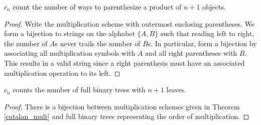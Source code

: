\documentclass[a4paper]{article}
\begin{document}
\begin{theorem}\label{catalan_mult}
$c_n$ count the number of ways to parenthesize a product of $n+1$ objects.

\begin{hl}
\begin{proof}
Write the multiplication scheme with outermost enclosing parentheses. We form a bijection to strings on the alphabet $\{A,B\}$ such that reading left to right, the number of $A$s never trails the number of $B$s. In particular, form a bijection by associating all multiplication symbols with $A$ and all right parentheses with $B$. This results in a valid string since a right parenthesis must have an associated multiplication operation to its left.
\end{proof}
\end{hl}
\end{theorem}

\begin{corollary}
$c_n$ counts the number of full binary trees with $n+1$ leaves.

\begin{hl}
\begin{proof}
There is a bijection between multiplication schemes given in Theorem \ref{catalan_mult} and full binary trees representing the order of multiplication.
\end{proof}
\end{hl}
\end{corollary}
\end{document}

